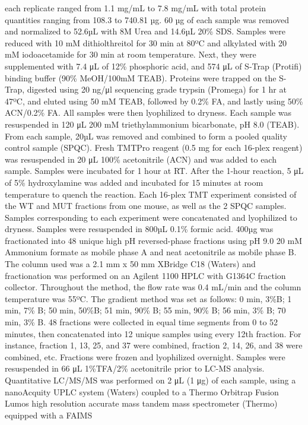 each replicate ranged from 1.1 mg/mL to 7.8 mg/mL with total protein quantities
ranging from 108.3 to 740.81 µg. 60 µg of each sample was removed and normalized
to 52.6µL with 8M Urea and 14.6µL 20\% SDS. Samples were reduced with 10 mM
dithiolthreitol for 30 min at 80ºC and alkylated with 20 mM iodoacetamide for 30
min at room temperature. Next, they were supplemented with 7.4 μL of 12\%
phosphoric acid, and 574 μL of S-Trap (Protifi) binding buffer (90\% MeOH/100mM
TEAB). Proteins were trapped on the S-Trap, digested using 20 ng/μl sequencing
grade trypsin (Promega) for 1 hr at 47ºC, and eluted using 50 mM TEAB, followed
by 0.2\% FA, and lastly using 50\% ACN/0.2\% FA. All samples were then lyophilized
to dryness.
Each sample was resuspended in 120 μL 200 mM triethylammonium bicarbonate, pH
8.0 (TEAB). From each sample, 20µL was removed and combined to form a pooled
quality control sample (SPQC). Fresh TMTPro reagent (0.5 mg for each 16-plex
reagent) was resuspended in 20 μL 100\% acetonitrile (ACN) and was added to each
sample. Samples were incubated for 1 hour at RT. After the 1-hour reaction, 5 μL
of 5\% hydroxylamine was added and incubated for 15 minutes at room temperature
to quench the reaction. Each 16-plex TMT experiment consisted of the WT and MUT
fractions from one mouse, as well as the 2 SPQC samples. Samples corresponding
to each experiment were concatenated and lyophilized to dryness.
Samples were resuspended in 800µL 0.1\% formic acid. 400µg was fractionated into
48 unique high pH reversed-phase fractions using pH 9.0 20 mM Ammonium formate
as mobile phase A and neat acetonitrile as mobile phase B. The column used was a
2.1 mm x 50 mm XBridge C18 (Waters) and fractionation was performed on an
Agilent 1100 HPLC with G1364C fraction collector. Throughout the method, the
flow rate was 0.4 mL/min and the column temperature was 55ºC. The gradient
method was set as follows: 0 min, 3\%B; 1 min, 7\% B; 50 min, 50\%B; 51 min, 90\% B;
55 min, 90\% B; 56 min, 3\% B; 70 min, 3\% B. 48 fractions were collected in equal
time segments from 0 to 52 minutes, then concatenated into 12 unique samples
using every 12th fraction. For instance, fraction 1, 13, 25, and 37 were
combined, fraction 2, 14, 26, and 38 were combined, etc. Fractions were frozen
and lyophilized overnight. Samples were resuspended in 66 μL 1\%TFA/2\%
acetonitrile prior to LC-MS analysis.
Quantitative LC/MS/MS was performed on 2 μL (1 μg) of each sample, using a
nanoAcquity UPLC system (Waters) coupled to a Thermo Orbitrap Fusion Lumos high
resolution accurate mass tandem mass spectrometer (Thermo) equipped with a FAIMS
